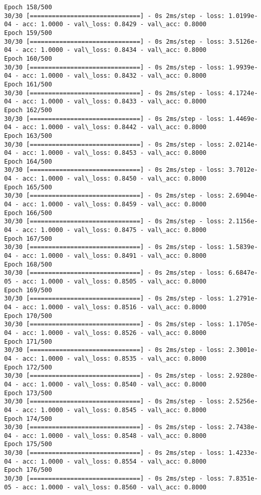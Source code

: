 \documentclass[11pt]{article}
\begin{document}
\begin{Verbatim}[commandchars=\\\{\}]
Epoch 158/500
30/30 [==============================] - 0s 2ms/step - loss: 1.0199e-04 - acc: 1.0000 - val\_loss: 0.8429 - val\_acc: 0.8000
Epoch 159/500
30/30 [==============================] - 0s 2ms/step - loss: 3.5126e-04 - acc: 1.0000 - val\_loss: 0.8434 - val\_acc: 0.8000
Epoch 160/500
30/30 [==============================] - 0s 2ms/step - loss: 1.9939e-04 - acc: 1.0000 - val\_loss: 0.8432 - val\_acc: 0.8000
Epoch 161/500
30/30 [==============================] - 0s 2ms/step - loss: 4.1724e-04 - acc: 1.0000 - val\_loss: 0.8433 - val\_acc: 0.8000
Epoch 162/500
30/30 [==============================] - 0s 2ms/step - loss: 1.4469e-04 - acc: 1.0000 - val\_loss: 0.8442 - val\_acc: 0.8000
Epoch 163/500
30/30 [==============================] - 0s 2ms/step - loss: 2.0214e-04 - acc: 1.0000 - val\_loss: 0.8453 - val\_acc: 0.8000
Epoch 164/500
30/30 [==============================] - 0s 2ms/step - loss: 3.7012e-04 - acc: 1.0000 - val\_loss: 0.8450 - val\_acc: 0.8000
Epoch 165/500
30/30 [==============================] - 0s 2ms/step - loss: 2.6904e-04 - acc: 1.0000 - val\_loss: 0.8459 - val\_acc: 0.8000
Epoch 166/500
30/30 [==============================] - 0s 2ms/step - loss: 2.1156e-04 - acc: 1.0000 - val\_loss: 0.8475 - val\_acc: 0.8000
Epoch 167/500
30/30 [==============================] - 0s 2ms/step - loss: 1.5839e-04 - acc: 1.0000 - val\_loss: 0.8491 - val\_acc: 0.8000
Epoch 168/500
30/30 [==============================] - 0s 2ms/step - loss: 6.6847e-05 - acc: 1.0000 - val\_loss: 0.8505 - val\_acc: 0.8000
Epoch 169/500
30/30 [==============================] - 0s 2ms/step - loss: 1.2791e-04 - acc: 1.0000 - val\_loss: 0.8516 - val\_acc: 0.8000
Epoch 170/500
30/30 [==============================] - 0s 2ms/step - loss: 1.1705e-04 - acc: 1.0000 - val\_loss: 0.8526 - val\_acc: 0.8000
Epoch 171/500
30/30 [==============================] - 0s 2ms/step - loss: 2.3001e-04 - acc: 1.0000 - val\_loss: 0.8535 - val\_acc: 0.8000
Epoch 172/500
30/30 [==============================] - 0s 2ms/step - loss: 2.9280e-04 - acc: 1.0000 - val\_loss: 0.8540 - val\_acc: 0.8000
Epoch 173/500
30/30 [==============================] - 0s 2ms/step - loss: 2.5256e-04 - acc: 1.0000 - val\_loss: 0.8545 - val\_acc: 0.8000
Epoch 174/500
30/30 [==============================] - 0s 2ms/step - loss: 2.7438e-04 - acc: 1.0000 - val\_loss: 0.8548 - val\_acc: 0.8000
Epoch 175/500
30/30 [==============================] - 0s 2ms/step - loss: 1.4233e-04 - acc: 1.0000 - val\_loss: 0.8554 - val\_acc: 0.8000
Epoch 176/500
30/30 [==============================] - 0s 2ms/step - loss: 7.8351e-05 - acc: 1.0000 - val\_loss: 0.8560 - val\_acc: 0.8000

\end{Verbatim}
\end{document}
